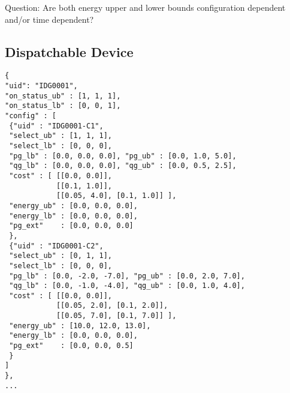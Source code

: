 \begin{todo}[]{}
Question: Are both energy upper and lower bounds configuration dependent and/or time dependent?  
\end{todo}
\subsection{Dispatchable Device}
\label{sec:generator_time}
\begin{verbatim}
{
"uid": "IDG0001",
"on_status_ub" : [1, 1, 1],
"on_status_lb" : [0, 0, 1],
"config" : [
 {"uid" : "IDG0001-C1",
 "select_ub" : [1, 1, 1],
 "select_lb" : [0, 0, 0],
 "pg_lb" : [0.0, 0.0, 0.0], "pg_ub" : [0.0, 1.0, 5.0],
 "qg_lb" : [0.0, 0.0, 0.0], "qg_ub" : [0.0, 0.5, 2.5],
 "cost" : [ [[0.0, 0.0]],
            [[0.1, 1.0]],
            [[0.05, 4.0], [0.1, 1.0]] ],
 "energy_ub" : [0.0, 0.0, 0.0],
 "energy_lb" : [0.0, 0.0, 0.0],
 "pg_ext"    : [0.0, 0.0, 0.0]
 },
 {"uid" : "IDG0001-C2",
 "select_ub" : [0, 1, 1],
 "select_lb" : [0, 0, 0],
 "pg_lb" : [0.0, -2.0, -7.0], "pg_ub" : [0.0, 2.0, 7.0],
 "qg_lb" : [0.0, -1.0, -4.0], "qg_ub" : [0.0, 1.0, 4.0],
 "cost" : [ [[0.0, 0.0]],
            [[0.05, 2.0], [0.1, 2.0]],
            [[0.05, 7.0], [0.1, 7.0]] ],
 "energy_ub" : [10.0, 12.0, 13.0],
 "energy_lb" : [0.0, 0.0, 0.0],
 "pg_ext"    : [0.0, 0.0, 0.5]
 }
]
}, 
... 
\end{verbatim}




